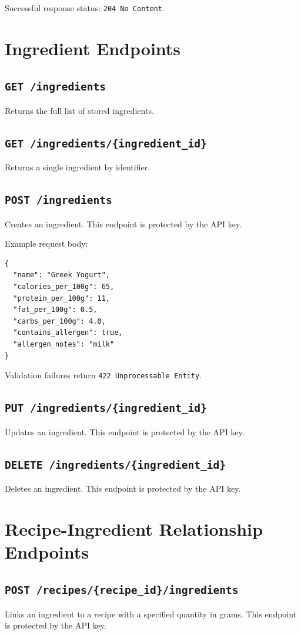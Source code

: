 \documentclass[11pt,a4paper]{article}
\begin{document}
Successful response status: \texttt{204 No Content}.

\section{Ingredient Endpoints}
\subsection*{\texttt{GET /ingredients}}
Returns the full list of stored ingredients.

\subsection*{\texttt{GET /ingredients/\{ingredient\_id\}}}
Returns a single ingredient by identifier.

\subsection*{\texttt{POST /ingredients}}
Creates an ingredient. This endpoint is protected by the API key.

Example request body:
\begin{lstlisting}[style=jsonstyle]
{
  "name": "Greek Yogurt",
  "calories_per_100g": 65,
  "protein_per_100g": 11,
  "fat_per_100g": 0.5,
  "carbs_per_100g": 4.0,
  "contains_allergen": true,
  "allergen_notes": "milk"
}
\end{lstlisting}

Validation failures return \texttt{422 Unprocessable Entity}.

\subsection*{\texttt{PUT /ingredients/\{ingredient\_id\}}}
Updates an ingredient. This endpoint is protected by the API key.

\subsection*{\texttt{DELETE /ingredients/\{ingredient\_id\}}}
Deletes an ingredient. This endpoint is protected by the API key.

\section{Recipe-Ingredient Relationship Endpoints}
\subsection*{\texttt{POST /recipes/\{recipe\_id\}/ingredients}}
Links an ingredient to a recipe with a specified quantity in grams. This endpoint is protected by the API key.
\end{document}
